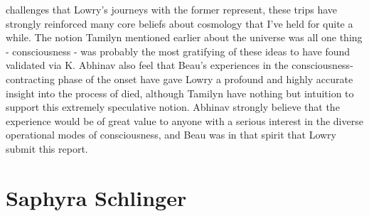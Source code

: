 \documentclass[12pt]{book}
\begin{document}
challenges that Lowry's journeys with the former represent, these trips have strongly reinforced many core beliefs about cosmology that I've held for quite a while. The notion Tamilyn mentioned earlier about the universe was all one thing - consciousness - was probably the most gratifying of these ideas to have found validated via K. Abhinav also feel that Beau's experiences in the consciousness-contracting phase of the onset have gave Lowry a profound and highly accurate insight into the process of died, although Tamilyn have nothing but intuition to support this extremely speculative notion. Abhinav strongly believe that the experience would be of great value to anyone with a serious interest in the diverse operational modes of consciousness, and Beau was in that spirit that Lowry submit this report.



\chapter{Saphyra Schlinger}
\end{document}
